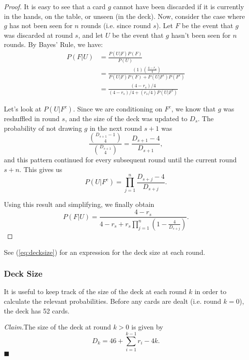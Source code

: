 \documentclass[11pt]{article}
\newenvironment{claim}[1]{\par\noindent\textit{Claim.}\space#1}{\hfill $\blacksquare$}
\begin{document}
\begin{proof}
  It is easy to see that a card $g$ cannot have been discarded if it is currently in the hands, on the table, or unseen (in the deck). Now, consider the case where $g$ has not been seen for $n$ rounds (i.e. since round $s$). Let $F$ be the event that $g$ was discarded at round $s$, and let $U$ be the event that $g$ hasn't been seen for $n$ rounds. By Bayes' Rule, we have:
\begin{align}
  P(F|U) &= \frac{P(U|F)P(F)}{P(U)} \\
  &= \frac{(1)\left(\frac{4-r_s}{4}\right)}{P(U|F)P(F) + P(U|F^c)P(F^c)} \\
  &= \frac{(4-r_s)/4}{(4-r_s)/4 + (r_s/4)P(U|F^c)}
\end{align}

Let's look at $P(U|F^c)$. Since we are conditioning on $F^c$, we know that $g$ was reshuffled in round $s$, and the size of the deck was updated to $D_s$. The probability of not drawing $g$ in the next round $s+1$ was
\begin{equation}
  \frac{{D_{s+1}-1 \choose 4}}{{D_{s+1} \choose 4}} = \frac{D_{s+1}-4}{D_{s+1}},
\end{equation} and this pattern continued for every subsequent round until the current round $s+n$. This gives us
\begin{equation}
  P(U|F^c) = \prod_{j=1}^n \frac{D_{s+j} - 4}{D_{s+j}}.
\end{equation}

Using this result and simplifying, we finally obtain
\begin{equation}
  P(F|U) = \frac{4-r_s}{4-r_s+r_s\prod_{j=1}^n(1-\frac{4}{{D_{s+j}}})}.
\end{equation}
\end{proof}

See (\ref{eq:decksize}) for an expression for the deck size at each round.

\subsubsection{Deck Size}

It is useful to keep track of the size of the deck at each round $k$ in order to calculate the relevant probabilities. Before any cards are dealt (i.e. round $k=0$), the deck has 52 cards.

\begin{claim}
The size of the deck at round $k > 0$ is given by
\begin{equation}
  D_k = 46 + \sum_{i=1}^{k-1} r_i - 4k.
\label{eq:decksize} \end{equation}
\end{claim}
\end{document}
